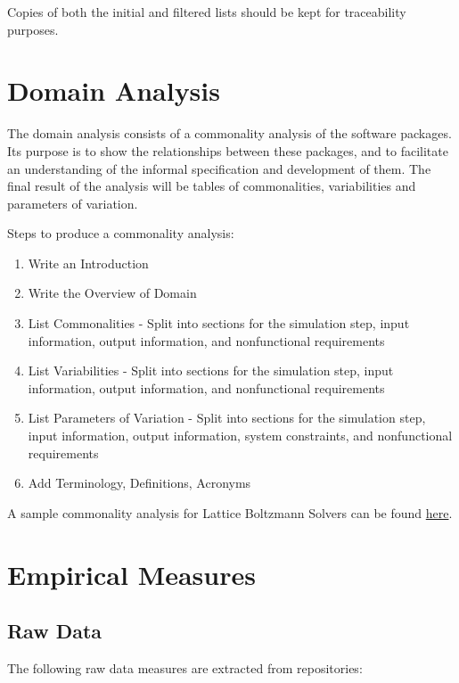 \documentclass[letterpaper,cleveref]{lipics-v2019}
\theoremstyle{definition}
\begin{document}
Copies of both the initial and filtered lists should be kept for traceability purposes.

\section{Domain Analysis} \label{SecDomainAnalysis}
The domain analysis consists of a commonality analysis of the software packages. Its purpose is to show the relationships between these packages, and to facilitate an understanding of the informal specification and development of them. The final result of the analysis will be tables of commonalities, variabilities and parameters of variation.

\noindent Steps to produce a commonality analysis:
\begin{enumerate}
\item Write an Introduction
\item Write the Overview of Domain
\item List Commonalities - Split into sections for the simulation step, input information, output information, and nonfunctional requirements
\item List Variabilities - Split into sections for the simulation step, input information, output information, and nonfunctional requirements
\item List Parameters of Variation - Split into sections for the simulation step, input information, output information, system constraints, and nonfunctional requirements
\item Add Terminology, Definitions, Acronyms
\end{enumerate}

A sample commonality analysis for Lattice Boltzmann Solvers can be found
\href{run:../Peter-Notes/Commonality-Analysis-LB-Systems.pdf}{here}.

\section{Empirical Measures} \label{SecEmpiricalMeasures}

\subsection{Raw Data}
The following raw data measures are extracted from repositories:
\end{document}
